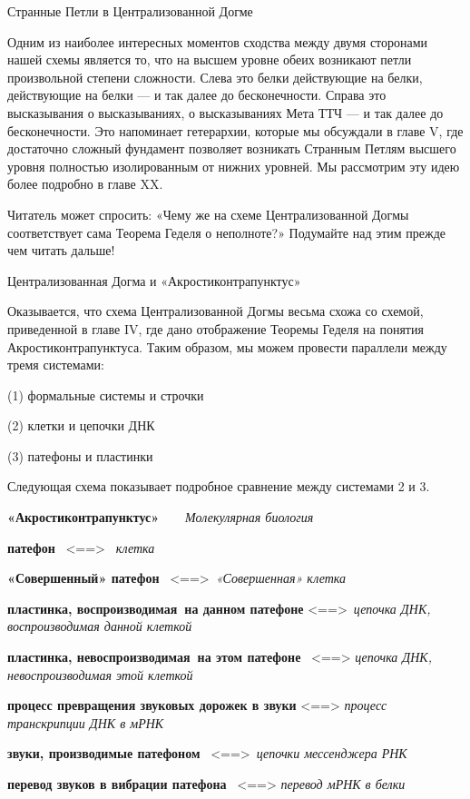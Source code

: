 \documentclass[../main.tex]{subfiles}
\begin{document}
Странные Петли в Централизованной Догме

Одним из наиболее интересных моментов сходства между двумя сторонами нашей схемы является то, что на высшем уровне обеих возникают петли произвольной степени сложности. Слева это белки действующие на белки, действующие на белки --- и так далее до бесконечности. Справа это высказывания о высказываниях, о высказываниях Мета ТТЧ --- и так далее до бесконечности. Это напоминает гетерархии, которые мы обсуждали в главе V, где достаточно сложный фундамент позволяет возникать Странным Петлям высшего уровня полностью изолированным от нижних уровней. Мы рассмотрим эту идею более подробно в главе XX.

Читатель может спросить: «Чему же на схеме Централизованной Догмы соответствует сама Теорема Геделя о неполноте?» Подумайте над этим прежде чем читать дальше!

Централизованная Догма и «Акростиконтрапунктус»

Оказывается, что схема Централизованной Догмы весьма схожа со схемой, приведенной в главе IV, где дано отображение Теоремы Геделя на понятия Акростиконтрапунктуса. Таким образом, мы можем провести параллели между тремя системами:

(1) формальные системы и строчки

(2) клетки и цепочки ДНК

(3) патефоны и пластинки

Следующая схема показывает подробное сравнение между системами 2 и 3.

\textbf{«Акростиконтрапунктус»~~~} \emph{Молекулярная биология}

\textbf{патефон} ~\textless==\textgreater~ \emph{клетка}

\textbf{«Совершенный» патефон} ~\textless==\textgreater~\emph{«Совершенная» клетка}

\textbf{пластинка, воспроизводимая~на данном патефоне} \textless==\textgreater~\emph{цепочка ДНК, воспроизводимая данной клеткой}

\textbf{пластинка, невоспроизводимая~на этом патефоне} ~\textless==\textgreater{} \emph{цепочка ДНК, невоспроизводимая этой клеткой}

\textbf{процесс превращения звуковых дорожек в звуки} \textless==\textgreater{} \emph{процесс транскрипции ДНК в мРНК}

\textbf{звуки, производимые патефоном} ~\textless==\textgreater~\emph{цепочки мессенджера РНК}

\textbf{перевод звуков в вибрации патефона} ~\textless==\textgreater{} \emph{перевод мРНК в белки}
\end{document}
